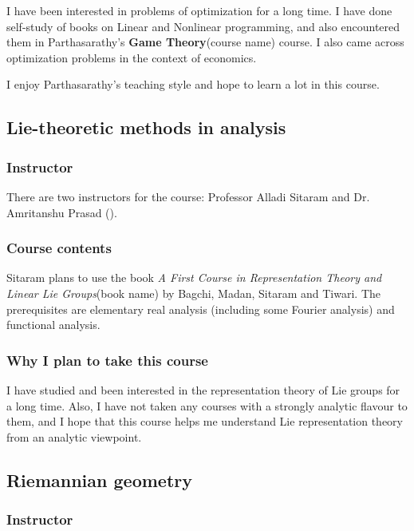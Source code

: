 \documentclass[a4paper]{amsart}
\newcommand{\coursename}[1]{{\bf #1}{\small{(course name)}}}
\newcommand{\bookname}[1]{{\em #1}{\small{(book name)}}}
\begin{document}
I have been interested in problems of optimization for a long time. I
have done self-study of books on Linear and Nonlinear programming, and
also encountered them in Parthasarathy's \coursename{Game Theory}
course. I also came across optimization problems in the context of economics.

I enjoy Parthasarathy's teaching style and hope to learn a lot in this
course.

\subsection{Lie-theoretic methods in analysis}

\subsubsection{Instructor}

There are two instructors for the course: Professor Alladi Sitaram and Dr. Amritanshu Prasad
().

\subsubsection{Course contents}

Sitaram plans to use the book \bookname{A First Course in
  Representation Theory and Linear Lie Groups} by Bagchi, Madan,
Sitaram and Tiwari. The prerequisites are elementary real analysis
(including some Fourier analysis) and functional analysis.

\subsubsection{Why I plan to take this course}

I have studied and been interested in the representation theory of Lie groups for a long time.
Also, I have not taken any courses with a strongly analytic flavour to them, and I hope that 
this course helps me understand Lie representation theory from an analytic viewpoint.

\subsection{Riemannian geometry}

\subsubsection{Instructor}
\end{document}
